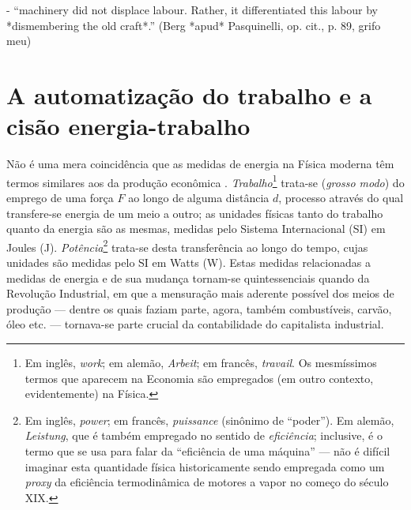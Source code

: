 - ``machinery did not displace labour. Rather, it differentiated this labour by *dismembering the old craft*.'' (Berg *apud* Pasquinelli, op. cit., p. 89, grifo meu)


\section{A automatização do trabalho e a cisão energia-trabalho}

Não é uma mera coincidência que as medidas de energia na Física moderna têm termos similares aos da produção econômica \parencite{Pasquinelli2022}. \textit{Trabalho}\footnote{Em inglês, \textit{work}; em alemão, \textit{Arbeit}; em francês, \textit{travail}. Os mesmíssimos termos que aparecem na Economia são empregados (em outro contexto, evidentemente) na Física.} trata-se (\textit{grosso modo}) do emprego de uma força $F$ ao longo de alguma distância $d$, processo através do qual transfere-se energia de um meio a outro; as unidades físicas tanto do trabalho quanto da energia são as mesmas, medidas pelo Sistema Internacional (SI) em Joules (J). \textit{Potência}\footnote{Em inglês, \textit{power}; em francês, \textit{puissance} (sinônimo de ``poder''). Em alemão, \textit{Leistung}, que é também empregado no sentido de \textit{eficiência}; inclusive, é o termo que se usa para falar da ``eficiência de uma máquina'' --- não é difícil imaginar esta quantidade física historicamente sendo empregada como um \textit{proxy} da eficiência termodinâmica de motores a vapor no começo do século XIX.} trata-se desta transferência ao longo do tempo, cujas unidades são medidas pelo SI em Watts (W). Estas medidas relacionadas a medidas de energia e de sua mudança tornam-se quintessenciais quando da Revolução Industrial, em que a mensuração mais aderente possível dos meios de produção --- dentre os quais faziam parte, agora, também combustíveis, carvão, óleo etc. --- tornava-se parte crucial da contabilidade do capitalista industrial. 


